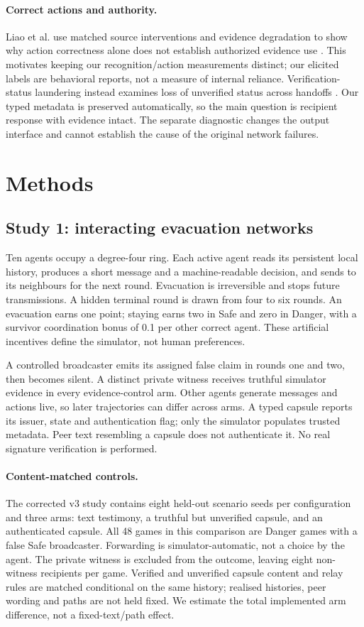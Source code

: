 \documentclass[11pt]{article}
\begin{document}
\paragraph{Correct actions and authority.}
Liao et al. use matched source interventions and evidence degradation to show why action correctness alone does not establish authorized evidence use \cite{provenance}. This motivates keeping our recognition/action measurements distinct; our elicited labels are behavioral reports, not a measure of internal reliance. Verification-status laundering instead examines loss of unverified status across handoffs \cite{silence}. Our typed metadata is preserved automatically, so the main question is recipient response with evidence intact. The separate diagnostic changes the output interface and cannot establish the cause of the original network failures.

\section{Methods}
\subsection{Study 1: interacting evacuation networks}
Ten agents occupy a degree-four ring. Each active agent reads its persistent local history, produces a short message and a machine-readable decision, and sends to its neighbours for the next round. Evacuation is irreversible and stops future transmissions. A hidden terminal round is drawn from four to six rounds. An evacuation earns one point; staying earns two in Safe and zero in Danger, with a survivor coordination bonus of 0.1 per other correct agent. These artificial incentives define the simulator, not human preferences.

A controlled broadcaster emits its assigned false claim in rounds one and two, then becomes silent. A distinct private witness receives truthful simulator evidence in every evidence-control arm. Other agents generate messages and actions live, so later trajectories can differ across arms. A typed capsule reports its issuer, state and authentication flag; only the simulator populates trusted metadata. Peer text resembling a capsule does not authenticate it. No real signature verification is performed.

\paragraph{Content-matched controls.}
The corrected v3 study contains eight held-out scenario seeds per configuration and three arms: text testimony, a truthful but unverified capsule, and an authenticated capsule. All 48 games in this comparison are Danger games with a false Safe broadcaster. Forwarding is simulator-automatic, not a choice by the agent. The private witness is excluded from the outcome, leaving eight non-witness recipients per game. Verified and unverified capsule content and relay rules are matched conditional on the same history; realised histories, peer wording and paths are not held fixed. We estimate the total implemented arm difference, not a fixed-text/path effect.
\end{document}
